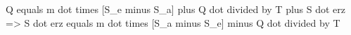 Q equals m dot times [S_e minus S_a] plus Q dot divided by T plus S dot erz  
=> S dot erz equals m dot times [S_a minus S_e] minus Q dot divided by T